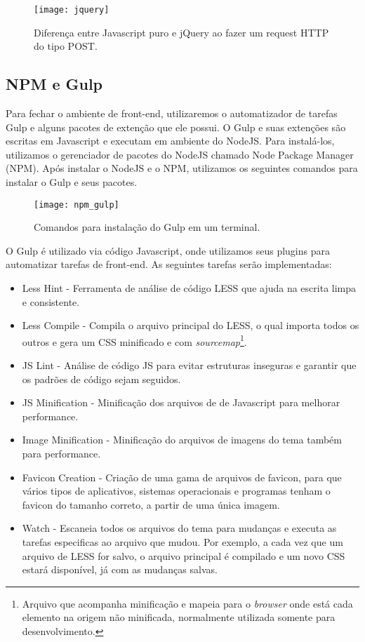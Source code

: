 \begin{figure}[ht]
  \centering
  \texttt{[image: jquery]}
  \caption{Diferença entre Javascript puro e jQuery ao fazer um request HTTP do tipo POST.}
  \label{jquery}
\end{figure}

\subsection{NPM e Gulp}
Para fechar o ambiente de front-end, utilizaremos o automatizador de tarefas Gulp e alguns pacotes de extenção que ele possui. O Gulp e suas extenções são escritas em Javascript e executam em ambiente do NodeJS. Para instalá-los, utilizamos o gerenciador de pacotes do NodeJS chamado Node Package Manager (NPM). Após instalar o NodeJS e o NPM, utilizamos os seguintes comandos para instalar o Gulp e seus pacotes.

\begin{figure}[ht]
  \centering
  \texttt{[image: npm\_gulp]}
  \caption{Comandos para instalação do Gulp em um terminal.}
  \label{npm_gulp}
\end{figure}

O Gulp é utilizado via código Javascript, onde utilizamos seus plugins para automatizar tarefas de front-end. As seguintes tarefas serão implementadas:

\begin{itemize}
  \item Less Hint - Ferramenta de análise de código LESS que ajuda na escrita limpa e consistente.
  \item Less Compile - Compila o arquivo principal do LESS, o qual importa todos os outros e gera um CSS minificado e com \textit{sourcemap}\footnote{Arquivo que acompanha minificação e mapeia para o \textit{browser} onde está cada elemento na origem não minificada, normalmente utilizada somente para desenvolvimento.}.
  \item JS Lint - Análise de código JS para evitar estruturas inseguras e garantir que os padrões de código sejam seguidos.
  \item JS Minification - Minificação dos arquivos de de Javascript para melhorar performance.
  \item Image Minification - Minificação do arquivos de imagens do tema também para performance.
  \item Favicon Creation - Criação de uma gama de arquivos de favicon, para que vários tipos de aplicativos, sistemas operacionais e programas tenham o favicon do tamanho correto, a partir de uma  única imagem.
  \item Watch - Escaneia todos os arquivos do tema para mudanças e executa as tarefas especificas ao arquivo que mudou. Por exemplo, a cada vez que um arquivo de LESS for salvo, o arquivo principal é compilado e um novo CSS estará disponível, já com as mudanças salvas.
\end{itemize}

